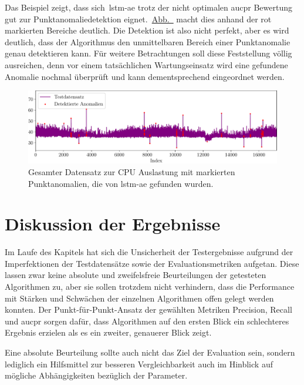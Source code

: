 Das Beispiel zeigt, dass sich~\ac{lstm-ae} trotz der nicht optimalen \ac{aucpr} Bewertung gut zur Punktanomaliedetektion
eignet.~\hyperref[fig:lstmae_points_CPU]{Abb.~} macht dies anhand der rot markierten Bereiche deutlich. Die Detektion ist also nicht
perfekt, aber es wird deutlich, dass der Algorithmus den unmittelbaren Bereich einer Punktanomalie genau detektieren kann. Für weitere Betrachtungen soll diese
Feststellung völlig ausreichen, denn vor einem tatsächlichen Wartungseinsatz wird eine gefundene Anomalie nochmal überprüft und kann dementsprechend eingeordnet
werden.

\begin{figure}[htbp]
    \centering
        \includegraphics[width=1\linewidth]{ch5_anomalieerkennung/abbildungen/LSTMAE_POINTS_CPU_beispiel.pdf}
    \caption{\centering Gesamter Datensatz zur CPU Auslastung mit markierten Punktanomalien, die von \acs*{lstm-ae} gefunden wurden.}
    \label{fig:lstmae_points_CPU}
\end{figure}

\section{Diskussion der Ergebnisse}
Im Laufe des Kapitels hat sich die Unsicherheit der Testergebnisse aufgrund der Imperfektionen der Testdatensätze sowie der Evaluationsmetriken aufgetan. Diese
lassen zwar keine absolute und zweifelsfreie Beurteilungen der getesteten Algorithmen zu, aber sie sollen trotzdem nicht verhindern, dass die Performance mit Stärken
und Schwächen der einzelnen Algorithmen offen gelegt werden konnten. Der Punkt-für-Punkt-Ansatz der gewählten Metriken Precision, Recall und \ac{aucpr} sorgen dafür,
dass Algorithmen auf den ersten Blick ein schlechteres Ergebnis erzielen als es ein zweiter, genauerer Blick zeigt.

Eine absolute Beurteilung sollte auch nicht das Ziel der Evaluation sein, sondern lediglich ein Hilfsmittel zur besseren Vergleichbarkeit auch im Hinblick auf
mögliche Abhängigkeiten bezüglich der Parameter.